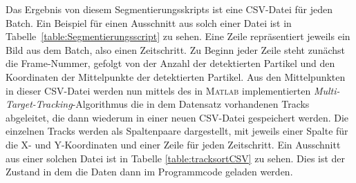 Das Ergebnis von diesem Segmentierungsskripts ist eine CSV-Datei für jeden Batch.
Ein Beispiel für einen Ausschnitt aus solch einer Datei ist in Tabelle~\ref{table:Segmentierungsscript} zu sehen.
Eine Zeile repräsentiert jeweils ein Bild aus dem Batch, also einen Zeitschritt.
Zu Beginn jeder Zeile steht zunächst die Frame-Nummer, gefolgt von der Anzahl der detektierten Partikel
und den Koordinaten der Mittelpunkte der detektierten Partikel.
Aus den Mittelpunkten in dieser CSV-Datei werden nun mittels des in \textsc{Matlab} implementierten \textit{Multi-Target-Tracking}-Algorithmus die in dem Datensatz vorhandenen Tracks abgeleitet,
die dann wiederum in einer neuen CSV-Datei gespeichert werden.
Die einzelnen Tracks werden als Spaltenpaare dargestellt, mit jeweils einer Spalte für die X- und Y-Koordinaten und einer Zeile für jeden Zeitschritt.
Ein Ausschnitt aus einer solchen Datei ist in Tabelle \ref{table:tracksortCSV} zu sehen.
Dies ist der Zustand in dem die Daten dann im Programmcode geladen werden. 

